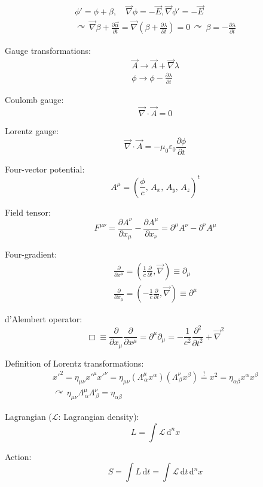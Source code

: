 \documentclass[fontsize=11pt,a4paper]{scrartcl}
\begin{document}
\begin{gather*}
	\phi'=\phi+\beta,\quad\vec\nabla\phi=-\vec E,\vec\nabla\phi'=-\vec E\\
	\curvearrowright\,\vec\nabla\beta+\frac{\partial\vec\alpha}{\partial t}=\vec\nabla\left(\beta+\frac{\partial\lambda}{\partial t}\right)=0\,\curvearrowright\,\beta=-\frac{\partial\lambda}{\partial t}
\end{gather*}

Gauge transformations:
\begin{gather*}
	\vec A\to\vec A+\vec\nabla\lambda\\
	\phi\to\phi-\frac{\partial\lambda}{\partial t}
\end{gather*}

Coulomb gauge:
\[
	\vec\nabla\cdot\vec A=0
\]

Lorentz gauge:
\[
	\vec\nabla\cdot\vec A=-\mu_0\varepsilon_0\frac{\partial\phi}{\partial t}
\]

Four-vector potential:
\[
	A^\mu=\left(\frac{\phi}{c},\,A_x,\,A_y,\,A_z\right)^t
\]

Field tensor:
\[
	F^{\mu\nu}=\frac{\partial A^\nu}{\partial x_\mu}-\frac{\partial A^\mu}{\partial x_\nu}=\partial^\mu A^\nu-\partial^\nu A^\mu
\]

Four-gradient:
\begin{gather*}
	\frac{\partial}{\partial x^\mu}=\left(\frac{1}{c}\frac{\partial}{\partial t},\vec\nabla\right)\equiv\partial_\mu\\
	\frac{\partial}{\partial x_\mu}=\left(-\frac{1}{c}\frac{\partial}{\partial t},\vec\nabla\right)\equiv\partial^\mu
\end{gather*}

d'Alembert operator:
\[
	\Box\equiv\frac{\partial}{\partial x_\mu}\frac{\partial}{\partial x^\mu}=\partial^\mu \partial_\mu=-\frac{1}{c^2}\frac{\partial^2}{\partial t^2}+\vec\nabla^2
\]

Definition of Lorentz transformations:
\begin{gather*}
	x'^2=\eta_{\mu\nu} x'^\mu x'^\nu=\eta_{\mu\nu} (\Lambda^\mu_{\,\alpha} x^\alpha) (\Lambda^\nu_{\,\beta} x^\beta)
	\stackrel{!}{=}x^2=\eta_{\alpha\beta} x^\alpha x^\beta\\
	\curvearrowright\,\eta_{\mu\nu} \Lambda^\mu_{\,\alpha} \Lambda^\nu_{\,\beta}=\eta_{\alpha\beta}
\end{gather*}

Lagrangian ($\mathcal{L}$: Lagrangian density):
\[
	L=\int\mathcal{L}\,\mathrm{d}^n x
\]

Action:
\[
	S=\int L\,\mathrm{d}t=\int\mathcal{L}\,\mathrm{d}t\,\mathrm{d}^n x
\]
\end{document}
